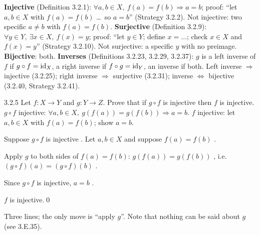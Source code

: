 
\begin{key}
\textbf{Injective} (Definition 3.2.1): $\forall a,b\in X,\ f(a)=f(b)\Rightarrow a=b$; proof: ``let $a,b\in X$ with $f(a)=f(b)$ \dots\ so $a=b$'' (Strategy 3.2.2). Not injective: two specific $a\ne b$ with $f(a)=f(b)$. \textbf{Surjective} (Definition 3.2.9): $\forall y\in Y,\ \exists x\in X,\ f(x)=y$; proof: ``let $y\in Y$; define $x=\dots$; check $x\in X$ and $f(x)=y$'' (Strategy 3.2.10). Not surjective: a specific $y$ with no preimage. \textbf{Bijective}: both. \textbf{Inverses} (Definitions 3.2.23, 3.2.29, 3.2.37): $g$ is a left inverse of $f$ if $g\circ f=\mathrm{id}_X$, a right inverse if $f\circ g=\mathrm{id}_Y$, an inverse if both. Left inverse $\Rightarrow$ injective (3.2.25); right inverse $\Rightarrow$ surjective (3.2.31); inverse $\Leftrightarrow$ bijective (3.2.40, Strategy 3.2.41).
\end{key}

\begin{bookex}[essential]{3.2.5}
Let $f:X\to Y$ and $g:Y\to Z$. Prove that if $g\circ f$ is injective then $f$ is injective.
\solution
\given $g\circ f$ injective: $\forall a,b\in X,\ g(f(a))=g(f(b))\Rightarrow a=b$.
\goal $f$ injective: let $a,b\in X$ with $f(a)=f(b)$; show $a=b$.
\begin{steps}
\item Suppose $g\circ f$ is injective . Let $a,b\in X$ and suppose $f(a)=f(b)$ .
\item Apply $g$ to both sides of $f(a)=f(b)$: $g(f(a))=g(f(b))$ , i.e.\ $(g\circ f)(a)=(g\circ f)(b)$ .
\item Since $g\circ f$ is injective, $a=b$ .
\end{steps}
\conclusion $f$ is injective.\qed
\begin{compare}
\item Three lines; the only move is ``apply $g$''. Note that nothing can be said about $g$ (see 3.E.35).
\end{compare}
\end{bookex}

